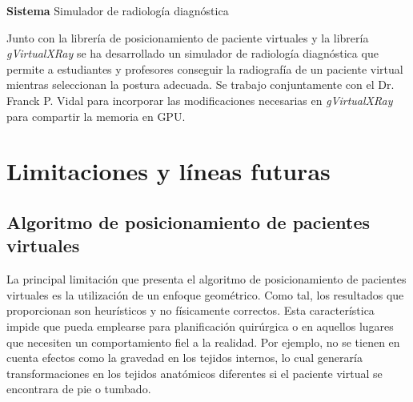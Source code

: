 \textbf{ Sistema } Simulador de radiología diagnóstica

Junto con la librería de posicionamiento de paciente virtuales y la librería \emph{gVirtualXRay} se ha desarrollado un simulador de radiología diagnóstica que permite a estudiantes y profesores conseguir la radiografía de un paciente virtual mientras seleccionan la postura adecuada. Se trabajo conjuntamente con el Dr. Franck P. Vidal para incorporar las modificaciones necesarias en \emph{gVirtualXRay} para compartir la memoria en \acs{GPU}. 







\section{Limitaciones y líneas futuras}
\label{conclu:future}

\subsection{Algoritmo de posicionamiento de pacientes virtuales}

La principal limitación que presenta el algoritmo de posicionamiento de pacientes virtuales es la utilización de un enfoque geométrico. Como tal, los resultados que proporcionan son heurísticos y no físicamente correctos. Esta característica impide que pueda emplearse para planificación quirúrgica o en aquellos lugares que necesiten un comportamiento fiel a la realidad. Por ejemplo, no se tienen en cuenta efectos como la gravedad en los tejidos internos, lo cual generaría transformaciones en los tejidos anatómicos diferentes si el paciente virtual se encontrara de pie o tumbado.

